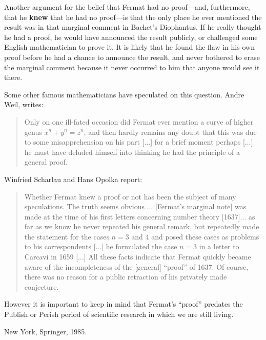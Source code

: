 Another argument for the belief that Fermat had no proof---and,
furthermore, that he {\bf knew} that he had no proof---is that the only
place he ever mentioned the result was in that marginal comment in
Bachet's Diophantus. If he really thought he had a proof, he would have
announced the result publicly, or challenged some English mathematician
to prove it. It is likely that he found the flaw in his own proof before
he had a chance to announce the result, and never bothered to erase the
marginal comment because it never occurred to him that anyone would see
it there.

Some other famous mathematicians have speculated on this question.
Andre Weil, writes:
\begin{quote}
  Only on one ill-fated occasion did Fermat ever mention a curve of
  higher genus $x^n+y^n=z^n$, and then hardly remains any doubt that
  this was due to some misapprehension on his part [$\ldots$] for a
  brief moment perhaps [$\ldots$] he must have deluded himself into
  thinking he had the principle of a general proof.
\end{quote}

Winfried Scharlau and Hans Opolka report:
\begin{quote}
  Whether Fermat knew a proof or not has been the subject of many
  speculations.  The truth seems obvious $\ldots$ [Fermat's marginal
  note] was made at the time of his first letters concerning number
  theory [1637]$\ldots$ as far as we know he never repeated his general
  remark, but repeatedly made the statement for the cases $n=3$ and $4$
  and posed these cases as problems to his correspondents [$\ldots$] he
  formulated the case $n=3$ in a letter to Carcavi in 1659 [$\ldots$]
  All these facts indicate that Fermat quickly became aware of the
  incompleteness of the [general] ``proof'' of 1637.  Of course, there
  was no reason for a public retraction of his privately made
  conjecture.
\end{quote}

However it is important to keep in mind that Fermat's ``proof'' predates
the Publish or Perish period of scientific research in which we are
still living.

\Ref

  {New
  York, Springer, 1985.}

